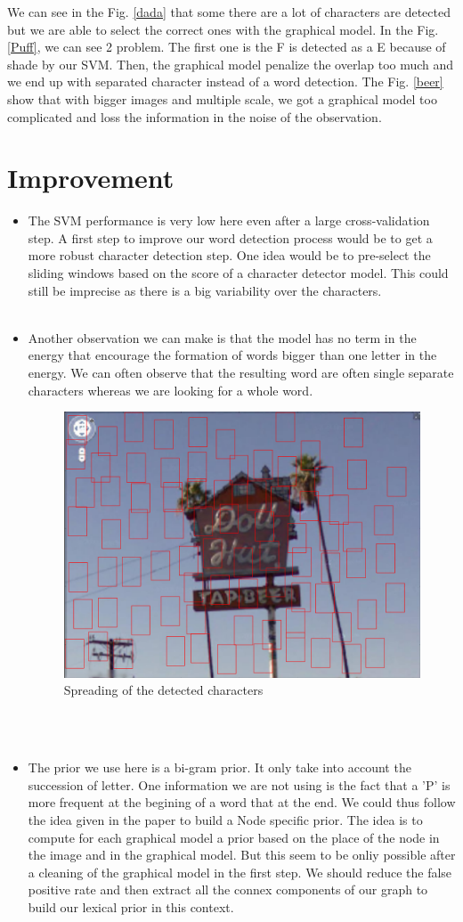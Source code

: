 \documentclass[10pt]{article}
\begin{document}
We can see in the Fig. \ref{dada} that some there are a lot of characters are detected but we are able to select the correct ones with the graphical model. In the Fig. \ref{Puff}, we can see 2 problem. The first one is the F is detected as a E because of shade by our SVM. Then, the graphical model penalize the overlap too much and we end up with separated character instead of a word detection. The Fig. \ref{beer} show that with bigger images and multiple scale, we got a graphical model too complicated and loss the information in the noise of the observation.


\section{Improvement\\}

\begin{itemize}
\item The SVM performance is very low here even after a large cross-validation step. A first step to improve our word detection process would be to get a more robust character detection step. One idea would be to pre-select the sliding windows based on the score of a character detector model. This could still be imprecise as there is a big variability over the characters.
\\\\
\item Another observation we can make is that the model has no term in the energy that encourage the formation of words bigger than one letter in the  energy. We can often observe that the resulting word are often single separate characters whereas we are looking for a whole word.
\begin{figure}[hc!]
\centering
\includegraphics[width=0.3\columnwidth]{figures/beer2.png}
\caption{Spreading of the detected characters}
\end{figure}
\\\\
\item The prior we use here is a bi-gram prior. It only take into account the succession of letter. One information we are not using is the fact that a 'P' is more frequent at the begining of a word that at the end. We could thus follow the idea given in the paper \cite{Mis} to build a Node specific prior. The idea is to compute for each graphical model a prior based on the place of the node in the image and in the graphical model. But this seem to be onliy possible after a cleaning of the graphical model in the first step. We should reduce the false positive rate and then extract all the connex components of our graph to build our lexical prior in this context.
\end{itemize}
\end{document}
